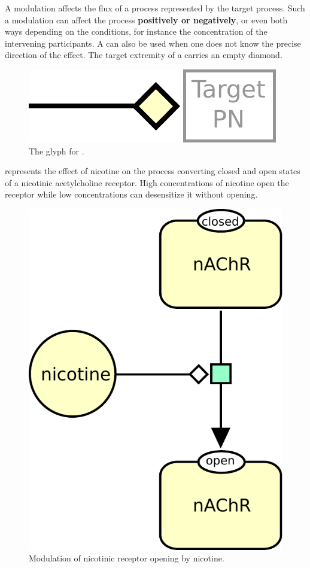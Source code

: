 A modulation affects the flux of a process represented by the target process. Such a modulation can affect the
process \textbf{positively or negatively}, or even both ways depending on the conditions, for instance the concentration of the intervening
participants. A  can also be used when one does not know the precise direction of the effect. The target extremity of a  carries an empty diamond.

\begin{figure}[H]
  \centering
  \includegraphics[scale = 0.5]{le_images/modulation}
  \caption{The \PD glyph for .}
  \label{fig:modulation}
\end{figure}

 represents the effect of nicotine on the process converting closed and open states of a nicotinic acetylcholine receptor. High concentrations of nicotine open the receptor while low concentrations can desensitize it without opening. 

\begin{figure}[H]
  \centering
  \includegraphics[scale = 0.5]{le_images/modulation-nAChR}
  \caption{Modulation of nicotinic receptor opening by nicotine.}
  \label{fig:modul-nico}
\end{figure}

